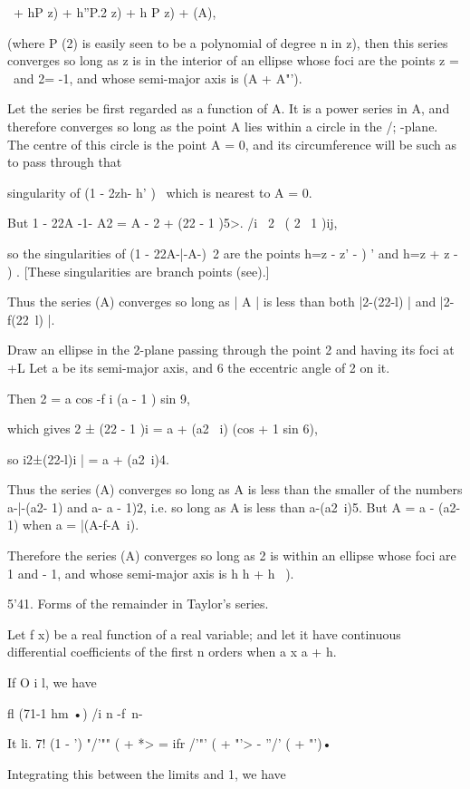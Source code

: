 {{\ + hP z) + h''P.2 z) + h P z) + (A),

(where P (2) is easily seen to be a polynomial of degree n in z), then
this series converges so long as z is in the interior of an ellipse
whose foci are the points z = \ and 2= -1, and whose semi-major axis
is (A + A"').

Let the series be first regarded as a function of A. It is a power
series in A, and therefore converges so long as the point A lies
within a circle in the /; -plane. The centre of this circle is the
point A = 0, and its circumference will be such as to pass through
that

singularity of (1 - 2zh- h' )~ which is nearest to A = 0.

But 1 - 22A -1- A2 = A - 2 + (22 - 1 )5>. /i \ 2 \ ( 2 \ 1 )ij,

so the singularities of (1 - 22A-|-A-)~2 are the points h=z - z' - ) '
and h=z + z - ) . [These singularities are branch points (see).]

Thus the series (A) converges so long as | A | is less than both
|2-(22-l) | and |2-f(22\ l) |.

Draw an ellipse in the 2-plane passing through the point 2 and having
its foci at +L Let a be its semi-major axis, and 6 the eccentric angle
of 2 on it.

Then 2 = a cos -f i (a - 1 ) sin 9,

which gives 2 ± (22 - 1 )i = a + (a2 \ i) (cos + 1 sin 6),

so i2±(22-l)i | = a + (a2\ i)4.

Thus the series (A) converges so long as A is less than the smaller of
the numbers a-|-(a2- 1) and a- a - 1)2, i.e. so long as A is less than
a-(a2\ i)5. But A = a - (a2- 1) when a = |(A-f-A~i).

Therefore the series (A) converges so long as 2 is within an ellipse
whose foci are 1 and - 1, and whose semi-major axis is h h + h~ ).

5'41. Forms of the remainder in Taylor's series.

Let f x) be a real function of a real variable; and let it have
continuous differential coefficients of the first n orders when a x a
+ h.

If O i l, we have

fl (71-1 hm •) /i n -f\ n-\

It li. 7! (1 - ') "/'"" ( + *> = ifr /'"' ( + "'> - ''/' ( + "')•

Integrating this between the limits and 1, we have

}}
